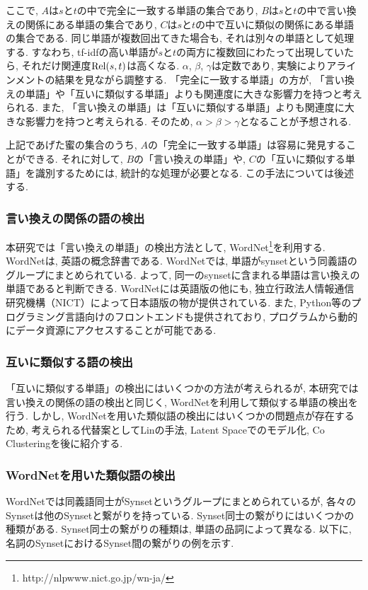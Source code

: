 \documentclass[12pt]{jarticle}
\begin{document}
ここで, $A$は$s$と$t$の中で完全に一致する単語の集合であり, $B$は$s$と$t$の中で言い換えの関係にある単語の集合であり, $C$は$s$と$t$の中で互いに類似の関係にある単語の集合である. 同じ単語が複数回出てきた場合も, それは別々の単語として処理する. すなわち, tf-idfの高い単語が$s$と$t$の両方に複数回にわたって出現していたら, それだけ関連度${\rm Rel}(s, t)$は高くなる. $\alpha$, $\beta$, $\gamma$は定数であり, 実験によりアラインメントの結果を見ながら調整する. 「完全に一致する単語」の方が, 「言い換えの単語」や「互いに類似する単語」よりも関連度に大きな影響力を持つと考えられる. また, 「言い換えの単語」は「互いに類似する単語」よりも関連度に大きな影響力を持つと考えられる. そのため, $\alpha > \beta > \gamma$となることが予想される. 

上記であげた蜜の集合のうち, $A$の「完全に一致する単語」は容易に発見することができる. それに対して, $B$の「言い換えの単語」や, $C$の「互いに類似する単語」を識別するためには, 統計的な処理が必要となる. この手法については後述する. 

\subsubsection{言い換えの関係の語の検出}
本研究では「言い換えの単語」の検出方法として, WordNet\footnote{http://nlpwww.nict.go.jp/wn-ja/}を利用する. WordNetは, 英語の概念辞書である. WordNetでは, 単語がsynsetという同義語のグループにまとめられている. よって, 同一のsynsetに含まれる単語は言い換えの単語であると判断できる. WordNetには英語版の他にも, 独立行政法人情報通信研究機構（NICT）によって日本語版の物が提供されている. また, Python等のプログラミング言語向けのフロントエンドも提供されており, プログラムから動的にデータ資源にアクセスすることが可能である. 

\subsubsection{互いに類似する語の検出}
「互いに類似する単語」の検出にはいくつかの方法が考えられるが, 本研究では言い換えの関係の語の検出と同じく, WordNetを利用して類似する単語の検出を行う. しかし, WordNetを用いた類似語の検出にはいくつかの問題点が存在するため, 考えられる代替案としてLinの手法\cite{DekangLin}, Latent Spaceでのモデル化\cite{LatentSpace}, Co Clustering\cite{CoClustering}を後に紹介する. 

\subsubsection{WordNetを用いた類似語の検出}
WordNetでは同義語同士がSynsetというグループにまとめられているが, 各々のSynsetは他のSynsetと繋がりを持っている. Synset同士の繋がりにはいくつかの種類がある. Synset同士の繋がりの種類は, 単語の品詞によって異なる. 以下に, 名詞のSynsetにおけるSynset間の繋がりの例を示す. 
\end{document}
